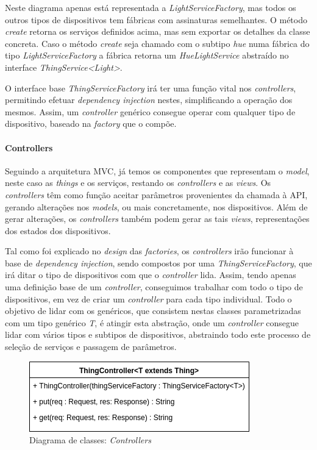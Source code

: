 Neste diagrama apenas está representada a \textit{LightServiceFactory}, mas todos os outros tipos de dispositivos tem fábricas com assinaturas semelhantes. O método \textit{create} retorna os serviços definidos acima, mas sem exportar os detalhes da classe concreta. Caso o método \textit{create} seja chamado com o subtipo \textit{hue} numa fábrica do tipo \textit{LightServiceFactory} a fábrica retorna um \textit{HueLightService} abstraído no interface \textit{ThingService<Light>}.

O interface base \textit{ThingServiceFactory} irá ter uma função vital nos \textit{controllers}, permitindo efetuar \textit{dependency injection} nestes, simplificando a operação dos mesmos. Assim, um \textit{controller} genérico consegue operar com qualquer tipo de dispositivo, baseado na \textit{factory} que o compõe.

%
%
%
%

\paragraph*{Controllers}

Seguindo a arquitetura MVC, já temos os componentes que representam o \textit{model}, neste caso as \textit{things} e os serviços, restando os \textit{controllers} e as \textit{views}. Os \textit{controllers} têm como função aceitar parâmetros provenientes da chamada à API, gerando alterações nos \textit{models}, ou mais concretamente, nos dispositivos. Além de gerar alterações, os \textit{controllers} também podem gerar as tais \textit{views}, representações dos estados dos dispositivos.

Tal como foi explicado no \textit{design} das \textit{factories}, os \textit{controllers} irão funcionar à base de \textit{dependency injection}, sendo compostos por uma \textit{ThingServiceFactory}, que irá ditar o tipo de dispositivos com que o \textit{controller} lida. Assim, tendo apenas uma definição base de um \textit{controller}, conseguimos trabalhar com todo o tipo de dispositivos, em vez de criar um \textit{controller} para cada tipo individual. Todo o objetivo de lidar com os genéricos, que consistem nestas classes parametrizadas com um tipo genérico \textit{T}, é atingir esta abstração, onde um \textit{controller} consegue lidar com vários tipos e subtipos de dispositivos, abstraindo todo este processo de seleção de serviços e passagem de parâmetros.

\begin{figure}[H]
  \centering
        \includegraphics[scale=0.75]{img/hub-controllers.png}
  \caption{Diagrama de classes: \textit{Controllers}}
\end{figure}

